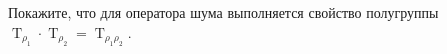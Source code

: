 Покажите, что для оператора шума выполняется свойство полугруппы
$\operatorname{T}_{\rho_1} \cdot \operatorname{T}_{\rho_2} = \operatorname{T}_{\rho_1 \rho_2}$.
